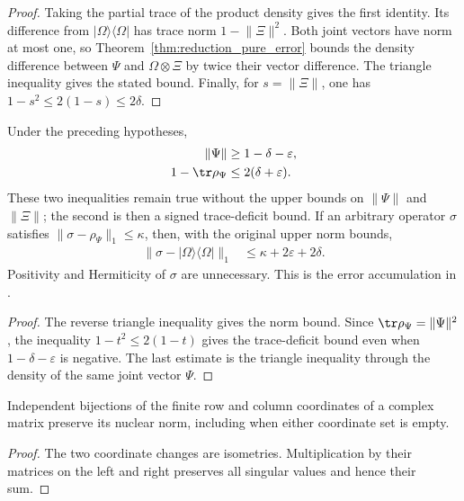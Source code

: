 \begin{proof}
    Taking the partial trace of the product density gives the first
    identity. Its difference from $|\Omega\rangle\langle\Omega|$ has
    trace norm $1-\lVert\Xi\rVert^2$. Both joint vectors have norm at
    most one, so Theorem~\ref{thm:reduction_pure_error} bounds the density
    difference between $\Psi$ and $\Omega\otimes\Xi$ by twice their
    vector difference. The triangle inequality gives the stated bound.
    Finally, for $s=\lVert\Xi\rVert$, one has
    $1-s^2\leq2(1-s)\leq2\delta$.
\end{proof}

\begin{corollary}
    \label{cor:product_reference_norm_compression}
    Under the preceding hypotheses,
    \begin{align}
        \lVert\Psi\rVert &\geq1-\delta-\varepsilon,\\
        1-\tr\rho_\Psi &\leq2(\delta+\varepsilon).
    \end{align}
    These two inequalities remain true without the upper bounds on
    $\lVert\Psi\rVert$ and $\lVert\Xi\rVert$; the second is then a signed
    trace-deficit bound. If an arbitrary operator $\sigma$ satisfies
    $\lVert\sigma-\rho_\Psi\rVert_1\leq\kappa$, then, with the original
    upper norm bounds,
    \begin{align}
        \lVert\sigma-|\Omega\rangle\langle\Omega|\rVert_1
          &\leq\kappa+2\varepsilon+2\delta.
    \end{align}
    Positivity and Hermiticity of $\sigma$ are unnecessary.
    This is the error accumulation in
    \cite[Section~8.1]{OpenAI2026PolynomialPEPS}.
\end{corollary}

\begin{proof}
    The reverse triangle inequality gives the norm bound. Since
    $\tr\rho_\Psi=\lVert\Psi\rVert^2$, the inequality
    $1-t^2\leq2(1-t)$ gives the trace-deficit bound even when
    $1-\delta-\varepsilon$ is negative. The last estimate is the
    triangle inequality through the density of the same joint vector
    $\Psi$.
\end{proof}

\begin{lemma}
    \label{lem:rectangular_trace_norm_reindex}
    Independent bijections of the finite row and column coordinates of
    a complex matrix preserve its nuclear norm, including when either
    coordinate set is empty.
\end{lemma}

\begin{proof}
    The two coordinate changes are isometries. Multiplication by their
    matrices on the left and right preserves all singular values and
    hence their sum.
\end{proof}
